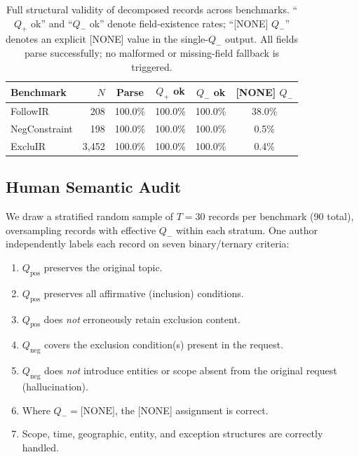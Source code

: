 \documentclass[letterpaper]{article}
\newcommand{\qpos}{Q_{\text{pos}}}
\newcommand{\qneg}{Q_{\text{neg}}}
\newcommand{\qplus}{Q_{+}}
\newcommand{\qminus}{Q_{-}}
\begin{document}
\begin{table}[t]
\centering
\small
\setlength{\tabcolsep}{3pt}
\begin{tabular}{l r c c c c}
\toprule
\textbf{Benchmark} & \textbf{$N$} & \textbf{Parse} &
\textbf{$\qplus$ ok} & \textbf{$\qminus$ ok} & \textbf{[NONE] $\qminus$} \\
\midrule
FollowIR     &   208 & 100.0\% & 100.0\% & 100.0\% & 38.0\% \\
NegConstraint &   198 & 100.0\% & 100.0\% & 100.0\% &  0.5\% \\
ExcluIR      & 3{,}452 & 100.0\% & 100.0\% & 100.0\% &  0.4\% \\
\bottomrule
\end{tabular}
\caption{Full structural validity of decomposed records across benchmarks.
``$\qplus$ ok'' and ``$\qminus$ ok'' denote field-existence rates;
``[NONE] $\qminus$'' denotes an explicit [NONE] value in the single-$\qminus$
output.  All fields parse successfully; no
malformed or missing-field fallback is triggered.}
\label{tab:structural-validity}
\end{table}

\subsection{Human Semantic Audit}
\label{app:semantic-audit}

We draw a stratified random sample of $T{=}30$ records per benchmark
(90 total), oversampling records with effective $\qminus$ within each
stratum.  One author independently labels each record on seven
binary/ternary criteria:

\begin{enumerate}\setlength{\itemsep}{1pt}
  \item $\qpos$ preserves the original topic.
  \item $\qpos$ preserves all affirmative (inclusion) conditions.
  \item $\qpos$ does \emph{not} erroneously retain exclusion content.
  \item $\qneg$ covers the exclusion condition(s) present in the request.
  \item $\qneg$ does \emph{not} introduce entities or scope absent from
        the original request (hallucination).
  \item Where $\qminus{=}\text{[NONE]}$, the [NONE] assignment is correct.
  \item Scope, time, geographic, entity, and exception structures are
        correctly handled.
\end{enumerate}
\end{document}
